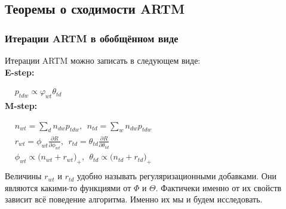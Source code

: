 \documentclass[12pt]{article}
\begin{document}
	\subsection{Теоремы о сходимости ARTM }
	\subsubsection{Итерации ARTM в обобщённом виде}	  
Итерации ARTM можно записать в следующем виде: \\
\textbf{E-step:}   
 
$
\begin{aligned}
& p_{tdw} \propto \varphi_{wt} \theta_{td}
\end{aligned}
$\medskip\\
\textbf{M-step:}

$
\begin{aligned}    
& n_{wt} = \sum\limits_{d} n_{dw} p_{tdw},~~n_{td} = \sum\limits_{w} n_{dw} p_{tdw}\\    
& r_{wt} =  \phi_{wt}\frac{\partial R}{\partial\phi_{wt}},~~ r_{td} =  \theta_{td}\frac{\partial R}{\partial\theta_{td}}\\
& \phi_{wt}  \propto \bigl(n_{wt} + r_{wt} \bigr)_{+},~~\theta_{td} \propto  \bigl(n_{td} + r_{td}\bigr)_{+}\\
\end{aligned}
$\medskip\\
Величины $r_{wt}$ и $r_{td}$ удобно называть регуляризационными добавками. Они являются какими-то функциями от $\Phi$ и $\Theta$. Фактичеки именно от их свойств зависит всё поведение алгоритма. Именно их мы и будем исследовать.
\end{document}
